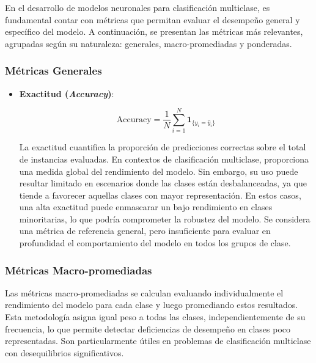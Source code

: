 En el desarrollo de modelos neuronales para clasificación multiclase, es fundamental contar con métricas que permitan evaluar el desempeño general y específico del modelo. A continuación, se presentan las métricas más relevantes, agrupadas según su naturaleza: generales, macro-promediadas y ponderadas.
\subsubsection*{Métricas Generales}

\begin{itemize}

\item \textbf{Exactitud (\textit{Accuracy})}:

\begin{equation}
\text{Accuracy} = \frac{1}{N} \sum_{i=1}^{N} \mathbf{1}_{\{y_i = \hat{y}_i\}}
\end{equation}

La exactitud cuantifica la proporción de predicciones correctas sobre el total de instancias evaluadas. En contextos de clasificación multiclase, proporciona una medida global del rendimiento del modelo. Sin embargo, su uso puede resultar limitado en escenarios donde las clases están desbalanceadas, ya que tiende a favorecer aquellas clases con mayor representación. En estos casos, una alta exactitud puede enmascarar un bajo rendimiento en clases minoritarias, lo que podría comprometer la robustez del modelo. Se considera una métrica de referencia general, pero insuficiente para evaluar en profundidad el comportamiento del modelo en todos los grupos de clase.

\end{itemize}

\subsubsection*{Métricas Macro-promediadas}

Las métricas macro-promediadas se calculan evaluando individualmente el rendimiento del modelo para cada clase y luego promediando estos resultados. Esta metodología asigna igual peso a todas las clases, independientemente de su frecuencia, lo que permite detectar deficiencias de desempeño en clases poco representadas. Son particularmente útiles en problemas de clasificación multiclase con desequilibrios significativos.

